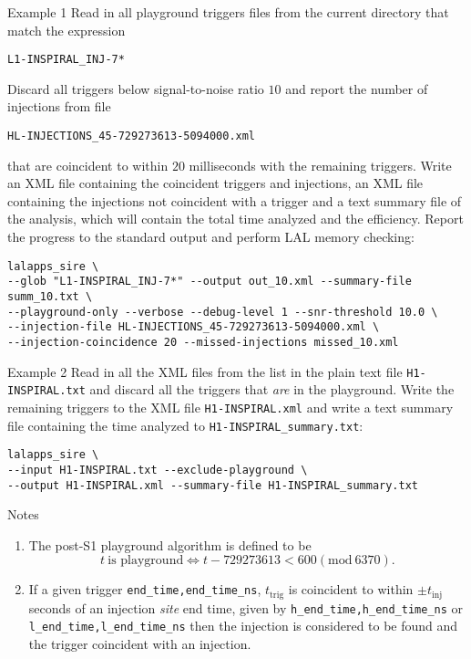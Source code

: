 \begin{entry}
\item[Example 1] Read in all playground triggers files from the current
directory that match the expression 
\begin{verbatim}
L1-INSPIRAL_INJ-7*
\end{verbatim}
Discard all triggers below signal-to-noise ratio $10$ and report the number of
injections from file 
\begin{verbatim}
HL-INJECTIONS_45-729273613-5094000.xml
\end{verbatim}
that are coincident to within $20$ milliseconds with the remaining triggers.
Write an XML file containing the coincident triggers and injections, an XML
file containing the injections not coincident with a trigger and a text
summary file of the analysis, which will contain the total time analyzed and
the efficiency. Report the progress to the standard output and perform LAL
memory checking:
\begin{verbatim}
lalapps_sire \
--glob "L1-INSPIRAL_INJ-7*" --output out_10.xml --summary-file summ_10.txt \
--playground-only --verbose --debug-level 1 --snr-threshold 10.0 \
--injection-file HL-INJECTIONS_45-729273613-5094000.xml \
--injection-coincidence 20 --missed-injections missed_10.xml
\end{verbatim}

\item[Example 2] Read in all the XML files from the list in the plain text
file \verb$H1-INSPIRAL.txt$ and discard all the triggers that \emph{are} in
the playground. Write the remaining triggers to the XML file
\verb$H1-INSPIRAL.xml$ and write a text summary file containing the time
analyzed to \verb$H1-INSPIRAL_summary.txt$:
\begin{verbatim}
lalapps_sire \
--input H1-INSPIRAL.txt --exclude-playground \
--output H1-INSPIRAL.xml --summary-file H1-INSPIRAL_summary.txt
\end{verbatim}

\item[Notes]
\begin{enumerate}
\item The post-S1 playground algorithm is defined to be
\begin{equation}
t \ \textrm{is playground} \iff t - 729273613 < 600 (\textrm{mod}\ 6370).
\end{equation}

\item If a given trigger \verb$end_time,end_time_ns$, $t_\mathrm{trig}$ is
coincident to within $\pm t_\mathrm{inj}$ seconds of an injection \emph{site}
end time, given by \verb$h_end_time,h_end_time_ns$ or
\verb$l_end_time,l_end_time_ns$ then the injection is considered to be found
and the trigger coincident with an injection.


\end{enumerate}
\end{entry}
